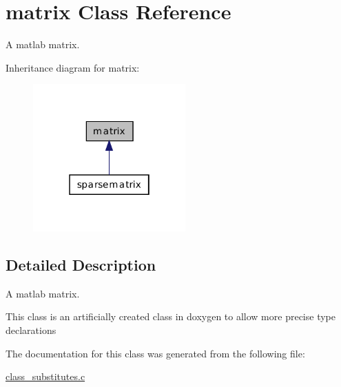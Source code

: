 \hypertarget{a00010}{\section{matrix Class Reference}
\label{a00010}
}


A matlab matrix.  




Inheritance diagram for matrix\-:\nopagebreak
\begin{figure}[H]
\begin{center}
\leavevmode
\includegraphics[width=166pt]{a00037}
\end{center}
\end{figure}


\subsection{Detailed Description}
A matlab matrix. 

This class is an artificially created class in doxygen to allow more precise type declarations 

The documentation for this class was generated from the following file\-:\begin{DoxyCompactItemize}
\item 
\hyperlink{a00016}{class\-\_\-substitutes.\-c}\end{DoxyCompactItemize}
